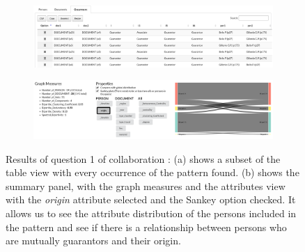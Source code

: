 
\begin{figure}[!h]
    \centering
    \begin{subfigure}[b]{\linewidth}
        \includegraphics[width=\textwidth]{static/figures/ComBiNet/Piemont-mutual-guarantor-table}
    \caption{}
    \end{subfigure}

    \begin{subfigure}[b]{\linewidth}
            \includegraphics[width=\textwidth]{static/figures/ComBiNet/piemont-mutual-guarantors-results}
    \caption{}
    \end{subfigure}

    \caption{Results of question 1 of collaboration \pascal: (a) shows a subset of the table view with every occurrence of the pattern found. (b) shows the summary panel, with the graph measures and the attributes view with the \textit{origin} attribute selected and the Sankey option checked. It allows us to see the attribute distribution of the persons included in the pattern and see if there is a relationship between persons who are mutually guarantors and their origin.
    }\label{fig:combinet-example-results}
\end{figure}



